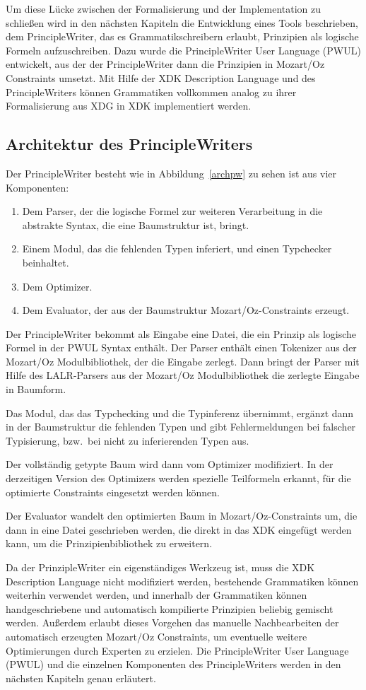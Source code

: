 Um diese L\"ucke zwischen der Formalisierung und der Implementation zu
schlie{\ss}en wird in den n\"achsten Kapiteln die Entwicklung eines
Tools beschrieben, dem PrincipleWriter, das es Grammatikschreibern
erlaubt, Prinzipien als logische Formeln aufzuschreiben. Dazu wurde
die PrincipleWriter User Language (PWUL) entwickelt, aus der der
PrincipleWriter dann die Prinzipien in Mozart/Oz Constraints umsetzt.
Mit Hilfe der XDK Description Language und des PrincipleWriters
k\"onnen Grammatiken vollkommen analog zu ihrer Formalisierung aus XDG
in XDK implementiert werden.

\subsection{Architektur des PrincipleWriters} 

Der PrincipleWriter besteht wie in Abbildung~\ref{archpw} zu sehen ist
aus vier Komponenten:
\begin{enumerate}
\item Dem Parser, der die logische Formel zur weiteren Verarbeitung in
  die abstrakte Syntax, die eine Baumstruktur ist, bringt.
\item Einem Modul, das die fehlenden Typen inferiert, und einen
  Typchecker beinhaltet.
\item Dem Optimizer.
\item Dem Evaluator, der aus der Baumstruktur
  Mozart/Oz-Constraints erzeugt.
\end{enumerate}
Der PrincipleWriter bekommt als Eingabe eine Datei, die ein Prinzip
als logische Formel in der PWUL Syntax enth\"alt. Der Parser enth\"alt
einen Tokenizer aus der Mozart/Oz Modulbibliothek, der die Eingabe
zerlegt. Dann bringt der Parser mit Hilfe des LALR-Parsers aus der
Mozart/Oz Modulbibliothek die zerlegte Eingabe in Baumform.

Das Modul, das das Typchecking und die Typinferenz \"ubernimmt,
erg\"anzt dann in der Baumstruktur die fehlenden Typen und gibt
Fehlermeldungen bei falscher Typisierung, bzw.\ bei nicht zu
inferierenden Typen aus.

Der vollst\"andig getypte Baum wird dann vom Optimizer modifiziert. In
der derzeitigen Version des Optimizers werden spezielle Teilformeln
erkannt, f\"ur die optimierte Constraints eingesetzt werden k\"onnen.

Der Evaluator wandelt den optimierten Baum in Mozart/Oz-Constraints
um, die dann in eine Datei geschrieben werden, die direkt in das XDK
eingef\"ugt werden kann, um die Prinzipienbibliothek zu erweitern.

Da der PrinzipleWriter ein eigenst\"andiges Werkzeug ist, muss die XDK
Description Language nicht modifiziert werden, bestehende Grammatiken
k\"onnen weiterhin verwendet werden, und innerhalb der Grammatiken
k\"onnen handgeschriebene und automatisch kompilierte Prinzipien
beliebig gemischt werden. Au{\ss}erdem erlaubt dieses Vorgehen das
manuelle Nachbearbeiten der automatisch erzeugten Mozart/Oz
Constraints, um eventuelle weitere Optimierungen durch Experten zu
erzielen. Die PrincipleWriter User Language (PWUL) und die einzelnen
Komponenten des PrincipleWriters werden in den n\"achsten Kapiteln
genau erl\"autert.
